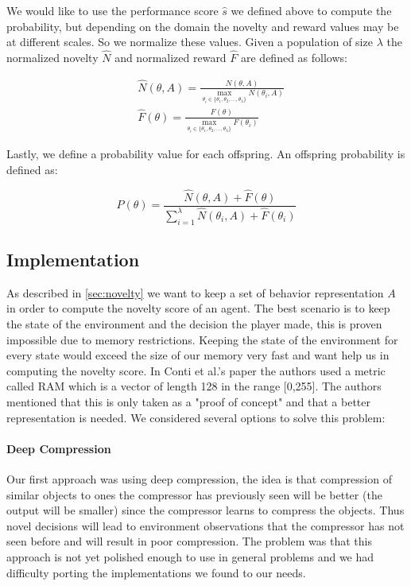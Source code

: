 \documentclass[11 pt, twocolumn]{article}
\begin{document}
We would like to use the performance score $\hat{s}$ we defined above to compute the probability, but depending on the domain the novelty and reward values may be at different scales. So we normalize these values. Given a population of size $\lambda$ the normalized novelty $\hat{N}$ and normalized reward $\hat{F}$ are defined as follows:

\begin{align*}
&\hat{N}(\theta,A)=\frac{N(\theta,A)}{\max_{\theta_i\in\{\theta_1,\theta_2,\dots,\theta_\lambda\}}N(\theta_i,A)}\\
&\hat{F}(\theta)=\frac{F(\theta)}{\max_{\theta_i\in\{\theta_1,\theta_2,\dots,\theta_\lambda\}}F(\theta_i)}
\end{align*}

Lastly, we define a probability value for each offspring. An offspring probability is defined as:

\begin{equation*}
P(\theta)=\frac{\hat{N}(\theta,A)+\hat{F}(\theta)}{\sum_{i=1}^{\lambda}\hat{N}(\theta_i,A)+\hat{F}(\theta_i)}
\end{equation*}

\subsection{Implementation}
As described in \ref{sec:novelty} we want to keep a set of behavior representation $A$ in order to compute the novelty score of an agent. The best scenario is to keep the state of the environment and the decision the player made, this is proven impossible due to memory restrictions. Keeping the state of the environment for every state would exceed the size of our memory very fast and want help us in computing the novelty score. In Conti et al.'s  paper the authors used a metric called RAM which is a vector of length 128 in the range [0,255]. The authors mentioned that this is only taken as a "proof of concept" and that a better representation is needed. We considered several options to solve this problem:
\paragraph{Deep Compression}
Our first approach was using deep compression, the idea is that compression of similar objects to ones the compressor has previously seen will be better (the output will be smaller) since the compressor learns to compress the objects. Thus novel decisions will lead to environment observations that the compressor has not seen before and will result in poor compression. The problem was that this approach is not yet polished enough to use in general problems and we had difficulty porting the implementations we found to our needs.
\end{document}
